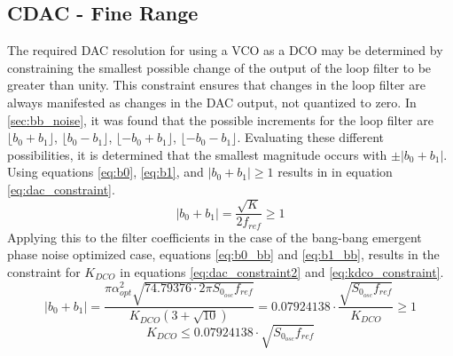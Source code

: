 	\FloatBarrier
	\subsection{CDAC - Fine Range}
	The required DAC resolution for using a VCO as a DCO may be determined by constraining the smallest possible change of the output of the loop filter to be greater than unity. This constraint ensures that changes in the loop filter are always manifested as changes in the DAC output, not quantized to zero. In \ref{sec:bb_noise}, it was found that the possible increments for the loop filter are $\lfloor b_0+b_1 \rfloor$, $\lfloor b_0-b_1 \rfloor$, $\lfloor -b_0+b_1 \rfloor$, $\lfloor -b_0-b_1 \rfloor$. Evaluating these different possibilities, it is determined that the smallest magnitude occurs with $\pm|b_0+b_1|$. Using equations \ref{eq:b0}, \ref{eq:b1}, and  $|b_0+b_1| \geq 1$ results in in equation \ref{eq:dac_constraint}.
	\begin{equation}\label{eq:dac_constraint}
		|b_0+b_1| = \frac{\sqrt{K}}{2f_{ref}} \geq 1
	\end{equation}
	Applying this to the filter coefficients in the case of the bang-bang emergent phase noise optimized case, equations \ref{eq:b0_bb} and \ref{eq:b1_bb}, results in the constraint for $K_{DCO}$ in equations  \ref{eq:dac_constraint2} and \ref{eq:kdco_constraint}.
	\begin{equation}\label{eq:dac_constraint2}
		|b_0+b_1| = \frac{\pi\alpha_{opt}^2\sqrt{74.79376\cdot2\pi S_{0_{osc}} f_{ref}}}{K_{DCO}(3+\sqrt{10})} = 0.07924138\cdot \frac{ \sqrt{S_{0_{osc}} f_{ref}}}{K_{DCO}} \geq 1
	\end{equation}
	\begin{equation}\label{eq:kdco_constraint}
		K_{DCO} \leq 0.07924138\cdot \sqrt{S_{0_{osc}} f_{ref}}
	\end{equation}

